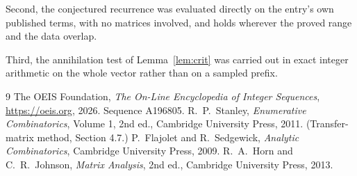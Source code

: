 \documentclass[11pt,a4paper]{article}
\theoremstyle{plain}
\theoremstyle{definition}
\begin{document}
Second, the conjectured recurrence was evaluated directly on the entry's own published terms,
with no matrices involved, and holds wherever the proved range and the data overlap.

Third, the annihilation test of Lemma~\ref{lem:crit} was carried out in exact integer
arithmetic on the whole vector rather than on a sampled prefix.

\begin{thebibliography}{9}
 The OEIS Foundation, \emph{The On-Line Encyclopedia of Integer
Sequences}, \url{https://oeis.org}, 2026. Sequence A196805.
 R.~P.~Stanley, \emph{Enumerative Combinatorics}, Volume 1, 2nd ed.,
Cambridge University Press, 2011. (Transfer-matrix method, Section 4.7.)
 P.~Flajolet and R.~Sedgewick, \emph{Analytic Combinatorics}, Cambridge
University Press, 2009.
 R.~A.~Horn and C.~R.~Johnson, \emph{Matrix Analysis}, 2nd ed., Cambridge
University Press, 2013.
\end{thebibliography}
\end{document}
